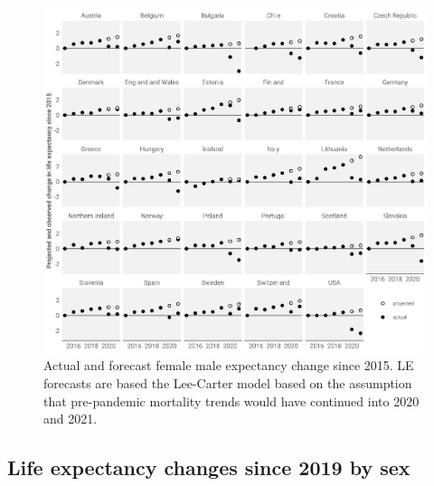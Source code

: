 \documentclass[12pt]{article}
\begin{document}
\begin{figure}[ht!]
    \centering
    \includegraphics{figure-a3.pdf}
    \caption{Actual and forecast female male expectancy change since 2015. LE forecasts are based the Lee-Carter model based on the assumption that pre-pandemic mortality trends would have continued into 2020 and 2021.}
    \label{fig:figure-a3}
\end{figure}

\clearpage

\subsection*{Life expectancy changes since 2019 by sex}
\end{document}
